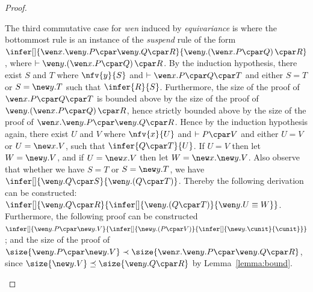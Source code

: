 \documentclass[UKenglish,acmsmall,authorversion]{acmart}
\theoremstyle{plain}
\begin{document}
{\begin{proof}
\begin{enumerate}[label=\textbf{\Alph*},ref=\Alph*,leftmargin=*]
{The third commutative case for \textit{wen} induced by \textit{equivariance} is where the bottommost rule is an instance of the \textit{suspend} rule of the form 
$
\infer[]{
\wen x. \wen y. P \cpar \wen y. Q \cpar R
}{
\mathopen{\wen y.} \left( \wen x. P \cpar Q \right) \cpar R
}
$, where $\vdash \mathopen{\wen y.} \left( \wen x. P \cpar Q \right) \cpar R$.
By the induction hypothesis, there exist $S$ and $T$ where $\nfv{y}{S}$ and $\vdash \wen x. P \cpar Q \cpar T$ and either $S = T$ or $S = \new y. T$ such that $\infer{R}{S}$.
Furthermore, the size of the proof of $\wen x. P \cpar Q \cpar T$ is bounded above by the size of the proof of $\mathopen{\wen y.} \left( \wen x. P \cpar Q \right) \cpar R$, hence strictly bounded above by the size of the proof of $\wen x. \wen y. P \cpar \wen y. Q \cpar R$.
Hence by the induction hypothesis again, there exist $U$ and $V$ where $\nfv{x}{U}$ and $\vdash P \cpar V$ and either $U = V$ or $U = \new x. V$, such that $\infer{Q \cpar T}{U}$.
%
If $U = V$ then let $W = \new y. V$, and if $U = \new x. V$ then  let $W = \new x. \new y. V$.
Also observe that whether we have $S = T$ or $S = \new y. T$, we have $
\infer[]{
\wen y. Q \cpar S
}{
\mathopen{\wen y.} \left( Q \cpar T \right)
}$.
Thereby the following derivation can be constructed:
$\infer[]{
\wen y. Q \cpar R
}{
\infer[]{
\mathopen{\wen y.} \left( Q \cpar T \right)
}{
\wen y. U \equiv W
}}$.
Furthermore, the following proof can be constructed $
\infer[]{
\wen y. P \cpar \new y. V
}{
\infer[]{
\mathopen{\new y.} \left( P \cpar V \right)
}{
\infer[]{
\new y. \cunit
}{
\cunit
}}}$;
and the size of the proof of $\size{ \wen y. P \cpar \new y. V } \prec \size{ \wen x. \wen y. P \cpar \wen y. Q \cpar R}$, since $\size{ \new y. V } \preceq \size{ \wen y. Q \cpar R }$ by Lemma~\ref{lemma:bound}.

}
\end{enumerate}
\end{proof}}
\end{document}
